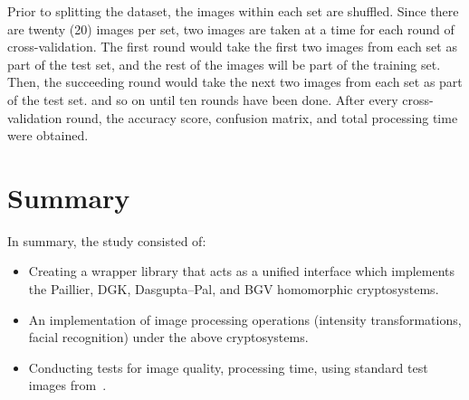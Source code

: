 Prior to splitting the dataset, the images within each set are shuffled. Since there are twenty (20) images per set, two images are taken at a time for each round of cross-validation. The first round would take the first two images from each set as part of the test set, and the rest of the images will be part of the training set. Then, the succeeding round would take the next two images from each set as part of the test set. and so on until ten rounds have been done. After every cross-validation round, the accuracy score, confusion matrix, and total processing time were obtained. 

\section{Summary}
In summary, the study consisted of:
\begin{itemize}
	\item Creating a wrapper library that acts as a unified interface which implements the Paillier, DGK, Dasgupta--Pal, and BGV homomorphic cryptosystems.
	\item An implementation of image processing operations (intensity transformations, facial recognition) under the above cryptosystems.
	\item Conducting tests for image quality, processing time, using standard test images from~\cite{gonzalez_image_nodate}.
\end{itemize}

